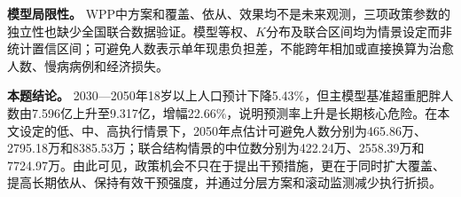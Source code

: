 \textbf{模型局限性。} WPP中方案和覆盖、依从、效果均不是未来观测，三项政策参数的独立性也缺少全国联合数据验证。模型等权、$K$分布及联合区间均为情景设定而非统计置信区间；可避免人数表示单年现患负担差，不能跨年相加或直接换算为治愈人数、慢病病例和经济损失。

\textbf{本题结论。} 2030---2050年18岁以上人口预计下降5.43\%，但主模型基准超重肥胖人数由7.596亿上升至9.317亿，增幅22.66\%，说明预测率上升是长期核心危险。在本文设定的低、中、高执行情景下，2050年点估计可避免人数分别为465.86万、2795.18万和8385.53万；联合结构情景的中位数分别为422.24万、2558.39万和7724.97万。由此可见，政策机会不只在于提出干预措施，更在于同时扩大覆盖、提高长期依从、保持有效干预强度，并通过分层方案和滚动监测减少执行折损。
